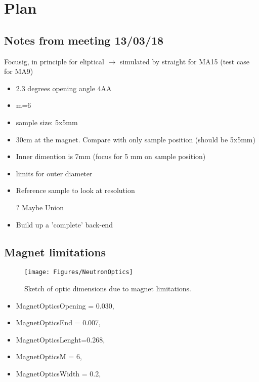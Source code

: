 \section{Plan}
\subsection{Notes from meeting 13/03/18}
Focusig, in principle for eliptical $\rightarrow$ simulated by straight
for MA15 (test case for MA9)
\begin{itemize}
\item 2.3 degrees opening angle \@ 4AA
\item m=6
\item sample size: 5x5mm
\item 30cm at the magnet. Compare with only sample position (should be 5x5mm)
\item Inner dimention is 7mm (focus for 5 mm on sample position)
\item limits for outer diameter
\item Reference sample to look at resolution
\item[?] Maybe Union
\item Build up a 'complete' back-end
\end{itemize}

\subsection{Magnet limitations}
\begin{figure}[H]\centering
\texttt{[image: Figures/NeutronOptics]}
\caption{Sketch of optic dimensions due to magnet limitations.}
\end{figure}
\begin{itemize}
\item MagnetOpticsOpening = 0.030,
\item MagnetOpticsEnd = 0.007,
\item MagnetOpticsLenght=0.268,
\item MagnetOpticsM = 6,
\item MagnetOpticsWidth = 0.2,
\end{itemize}

